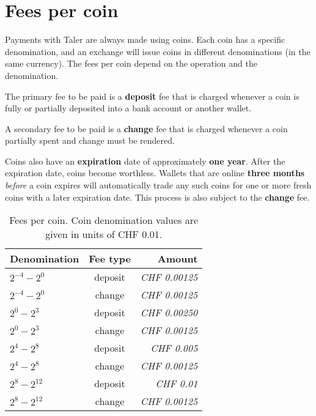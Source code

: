 \section{Fees per coin} \label{sec:fees:coin}

Payments with Taler are always made using coins.  Each coin has a specific
denomination, and an exchange will issue coins in different denominations (in
the same currency).  The fees per coin depend on the operation and the
denomination.

The primary fee to be paid is a {\bf deposit} fee that is
charged whenever a coin is fully or partially deposited
into a bank account or another wallet.

A secondary fee to be paid is a {\bf change} fee that is
charged whenever a coin partially spent and change must
be rendered.

Coins also have an {\bf expiration} date of approximately {\bf one year}.
After the expiration date, coins become worthless.  Wallets that are online
{\bf three months} {\em before} a coin expires will automatically trade any
such coins for one or more fresh coins with a later expiration date. This
process is also subject to the {\bf change} fee.


\begin{table}[h!]
  \caption{Fees per coin. Coin denomination values are given in units of CHF 0.01.}
  \label{table:fees:coins}
  \begin{center}
    \begin{tabular}{l|c|r}
      {\bf Denomination} & {\bf Fee type} & {\bf Amount}   \\ \hline \hline
     $2^{-4}-2^{ 0}$      & deposit        & {\em CHF 0.00125} \\
     $2^{-4}-2^{ 0}$      & change         & {\em CHF 0.00125} \\
     $2^{ 0}-2^{ 3}$      & deposit        & {\em CHF 0.00250} \\
     $2^{ 0}-2^{ 3}$      & change         & {\em CHF 0.00125} \\
     $2^{ 4}-2^{ 8}$      & deposit        & {\em CHF 0.005} \\
     $2^{ 4}-2^{ 8}$      & change         & {\em CHF 0.00125} \\
     $2^{ 8}-2^{12}$      & deposit        & {\em CHF 0.01} \\
     $2^{ 8}-2^{12}$      & change         & {\em CHF 0.00125} \\
    \end{tabular}
  \end{center}
\end{table}
